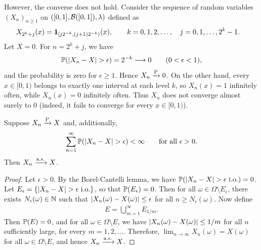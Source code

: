 However, the converse does not hold. Consider the sequence of random variables $(X_{n})_{n \geq 1}$ on $([0,1],\mathcal{B}([0,1]),\lambda)$ defined as
\begin{align}
    X_{2^{k}+j}(x) &= \textbf{1}_{[j2^{-k},(j+1)2^{-k})}(x),
    \qquad k=0,1,2,\ldots,\quad j=0,1,\ldots,2^{k}-1.
\end{align}
Let $X=0$. For $n=2^{k}+j$, we have
\begin{align}
    \Prob(\abs{X_n-X}>\epsilon) = 2^{-k} \longrightarrow 0
    \qquad (0<\epsilon<1),
\end{align}
and the probability is zero for $\epsilon\geq 1$. Hence $X_n\xrightarrow{\operatorname{P}} 0$. On the other hand, every $x\in[0,1)$ belongs to exactly one interval at each level $k$, so $X_n(x)=1$ infinitely often, while $X_n(x)=0$ infinitely often. Thus $X_n$ does not converge almost surely to $0$ (indeed, it fails to converge for every $x\in[0,1)$).

\begin{lemma}
    Suppose $X_{n} \xrightarrow{\operatorname{P}} X$ and, additionally,
    \begin{align}
        \sum_{n=1}^{\infty} \mathbb{P}(\left| X_{n}-X \right| > \epsilon) < \infty
        \qquad \text{for all } \epsilon > 0.
    \end{align}
    Then $X_{n} \xrightarrow{\operatorname{a.s.}} X$.
\end{lemma}
\begin{proof}
    Let $\epsilon > 0$. By the Borel-Cantelli lemma, we have $\mathbb{P}(\left| X_{n}-X \right| > \epsilon \text{ i.o.}) = 0$. Let $E_{\epsilon} = \{\left| X_{n}-X \right| > \epsilon \text{ i.o.}\}$, so that $\mathbb{P}(E_{\epsilon}) = 0$. Then for all $\omega \in \Omega \setminus E_{\epsilon}$, there exists $N_{\epsilon}(\omega) \in \mathbb{N}$ such that $\left| X_{n}(\omega)-X(\omega) \right| \leq \epsilon$ for all $n \geq N_{\epsilon}(\omega)$. Now define
    \begin{align}
        E = \bigcup_{m=1}^{\infty} E_{1/m}.
    \end{align}
    Then $\mathbb{P}(E) = 0$, and for all $\omega \in \Omega \setminus E$, we have $\left| X_{n}(\omega)-X(\omega) \right| \leq 1/m$ for all $n$ sufficiently large, for every $m=1,2,\ldots$. Therefore, $\lim_{n\to\infty} X_{n}(\omega) = X(\omega)$ for all $\omega \in \Omega\setminus E$, and hence $X_{n} \xrightarrow{\operatorname{a.s.}} X$.
\end{proof}

